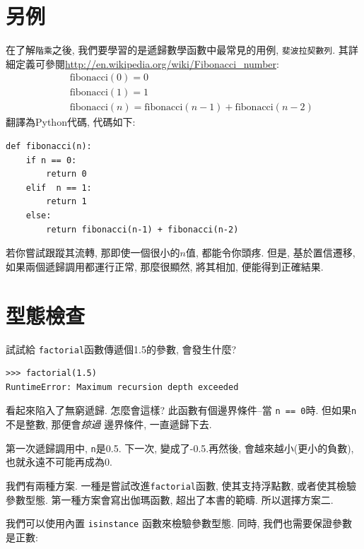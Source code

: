 \documentclass[10pt]{book}
\begin{document}
\section{另例}
\label{one.more.example}

在了解{\tt 階乘}之後, 我們要學習的是遞歸數學函數中最常見的用例, 
{\tt 斐波拉契數列}. 
其詳細定義可參閱\url{http://en.wikipedia.org/wiki/Fibonacci_number}:
%
\begin{eqnarray*}
&& \mathrm{fibonacci}(0) = 0 \\
&& \mathrm{fibonacci}(1) = 1 \\
&& \mathrm{fibonacci}(n) = \mathrm{fibonacci}(n-1) + \mathrm{fibonacci}(n-2)
\end{eqnarray*}
%
翻譯為Python代碼, 代碼如下:

\begin{verbatim}
def fibonacci(n):
    if n == 0:
        return 0
    elif  n == 1:
        return 1
    else:
        return fibonacci(n-1) + fibonacci(n-2)
\end{verbatim}
%
若你嘗試跟蹤其流轉, 那即使一個很小的$n$值, 都能令你頭疼. 
但是, 基於置信遷移, 如果兩個遞歸調用都運行正常, 那麼很顯然, 
將其相加, 便能得到正確結果. 


\section{型態檢查}
\label{guardian}

試試給 {\tt factorial}函數傳遞個1.5的參數, 會發生什麼?

\begin{verbatim}
>>> factorial(1.5)
RuntimeError: Maximum recursion depth exceeded
\end{verbatim}
%
看起來陷入了無窮遞歸. 怎麼會這樣? 此函數有個邊界條件--當 {\tt n == 0}時. 
但如果{\tt n}不是整數, 那便會{\em 掠過} 邊界條件, 一直遞歸下去. 

第一次遞歸調用中, { \tt n}是0.5. 
下一次, 變成了-0.5.再然後, 會越來越小(更小的負數), 
也就永遠不可能再成為0.

我們有兩種方案. 一種是嘗試改進{\tt factorial}函數, 使其支持浮點數, 
或者使其檢驗參數型態. 
第一種方案會寫出伽瑪函數, 超出了本書的範疇. 所以選擇方案二. 

我們可以使用內置 {\tt isinstance} 函數來檢驗參數型態. 
同時, 我們也需要保證參數是正數:
\end{document}
